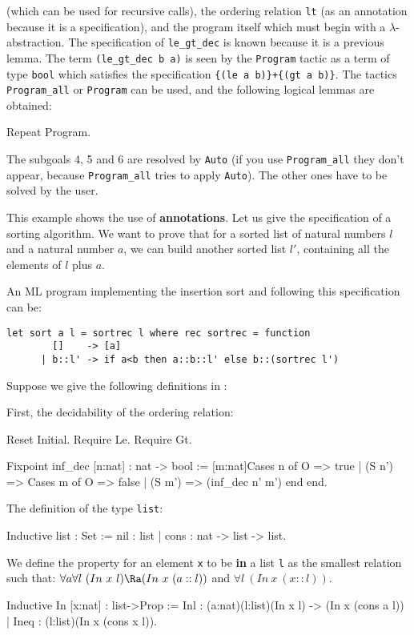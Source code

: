 (which can be used for recursive calls), the ordering relation
\verb=lt= (as an annotation because it is a specification), and the
program itself which must begin with a $\lambda$-abstraction. The
specification of \verb=le_gt_dec= is known because it is a previous
lemma.
The term \verb!(le_gt_dec b a)! is seen by the \verb!Program! tactic
as a term of type \verb!bool! which satisfies the specification 
\verb!{(le a b)}+{(gt a b)}!. 
The tactics \verb=Program_all= or \verb=Program= can be used, and the
following logical lemmas are obtained:
\begin{coq_example}
Repeat Program.
\end{coq_example}
The subgoals 4, 5 and 6 are resolved by \verb=Auto= (if you use
\verb=Program_all= they don't appear, because \verb=Program_all= tries
to apply \verb=Auto=). The other ones have to be solved by the user.


This example shows the use of {\bf annotations}. Let us give the
specification of a sorting algorithm. We want to prove that for a
sorted list of natural numbers $l$ and a natural number $a$, we can
build another sorted list $l'$, containing all the elements of $l$
plus $a$.

An ML program implementing the insertion sort and following this
specification can be:
\begin{verbatim}
let sort a l = sortrec l where rec sortrec = function
        []    -> [a]
      | b::l' -> if a<b then a::b::l' else b::(sortrec l')
\end{verbatim}
Suppose we give the following definitions in \Coq:

First, the decidability of the ordering relation:
\begin{coq_eval}
Reset Initial.
Require Le.
Require Gt.
\end{coq_eval}
\begin{coq_example*}
Fixpoint inf_dec [n:nat] : nat -> bool :=
[m:nat]Cases n of
         O      => true
       | (S n') => Cases m of
                      O     => false 
                   | (S m') => (inf_dec n' m')
                   end 
       end.
\end{coq_example*}

The definition of the type \verb=list=:
\begin{coq_example*}
Inductive list : Set := nil : list | cons : nat -> list -> list.
\end{coq_example*}

We define the property for an element \verb=x= to be {\bf in} a list
\verb=l= as the smallest relation such that: $\forall a \forall
l~(In~x~l) \Ra (In~x~(a::l))$ and $\forall l~(In~x~(x::l))$.
\begin{coq_example*}
Inductive In [x:nat] : list->Prop
        := Inl  : (a:nat)(l:list)(In x l) -> (In x (cons a l))
        | Ineq : (l:list)(In x (cons x l)).
\end{coq_example*}

